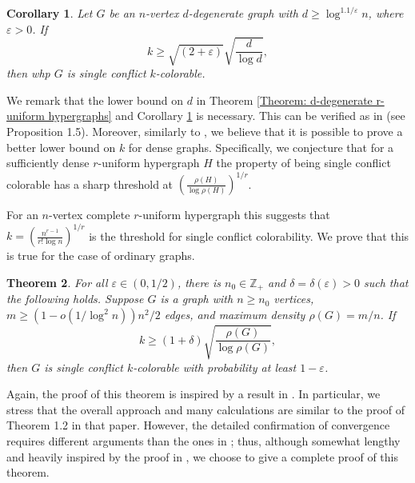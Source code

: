 \documentclass[12pt]{article}
\newtheorem{theorem}{Theorem}[section]
\newtheorem{corollary}[theorem]{Corollary}
\newcommand{\1}{\mathds{1}}
\newcommand{\Z}{\mathbb{Z}}
\begin{document}
\begin{corollary}
\label{Theorem: d-degenerate simple graphs}
Let $G$ be an $n$-vertex $d$-degenerate graph with $d\geq \log^{1.1/\varepsilon}n$, where $\varepsilon>0$. If
$$
k\geq \sqrt{(2+\varepsilon)}\sqrt{\frac{d}{\log d}},
$$
then whp $G$ is single conflict $k$-colorable. %
\end{corollary}


We remark that the lower bound on $d$ in Theorem \ref{Theorem: d-degenerate r-uniform hypergraphs} and
Corollary \ref{Theorem: d-degenerate simple graphs} is necessary. This can be verified as in
\cite{BernshteynDominikKaulMudrock} (see Proposition 1.5).
Moreover,
similarly to \cite{BernshteynDominikKaulMudrock}, we believe that it is possible to prove
a better lower bound on $k$ for dense graphs. Specifically, we conjecture that
for a sufficiently dense $r$-uniform hypergraph $H$ 
the property of being single conflict colorable has a sharp threshold
at $\left(\frac{\rho(H)}{\log \rho(H)}\right)^{1/r}$.

For an $n$-vertex complete $r$-uniform hypergraph this suggests that
$k=\left(\frac{n^{r-1}}{r! \log n} \right)^{1/r}$ is
the threshold for single conflict colorability. We prove that
this is true for the case of ordinary graphs.





\begin{theorem} 
\label{Theorem: P close to 1 for simple graphs}
    For all $\varepsilon \in (0,1/2)$, there is $n_0\in \Z_+$ and $\delta=\delta(\varepsilon)>0$ such that the following holds. Suppose $G$ is a graph with $n\geq n_0$ vertices, $m\geq (1-o(1/\log ^2n)) n^2/2$ edges, and maximum density $\rho(G)=m/n$. If
    $$k\geq  (1+\delta)\sqrt{\frac{\rho(G)}{\log \rho(G)}},$$
    then $G$ is single conflict $k$-colorable with probability at least $1-\varepsilon$.
\end{theorem}

Again, the proof of this theorem is inspired by a result in \cite{BernshteynDominikKaulMudrock}.
In particular, we stress that the overall approach and many calculations are similar to the proof of 
Theorem 1.2 in that paper. However, the detailed confirmation of
convergence requires different arguments than the ones
in \cite{BernshteynDominikKaulMudrock}; thus, although
somewhat lengthy and heavily inspired by the proof in \cite{BernshteynDominikKaulMudrock},
we choose to give a complete proof of this theorem.
\end{document}
